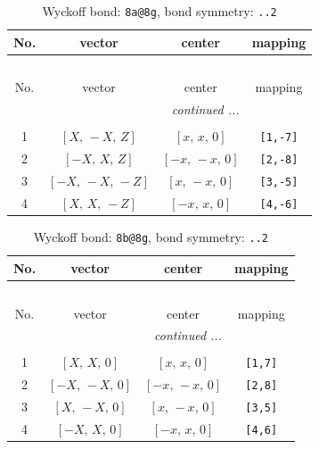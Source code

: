 \documentclass[fleqn,8pt]{jsarticle}
\begin{document}
\begin{longtable}{cccc}
\caption{Wyckoff bond: {\tt 8a@8g}, bond symmetry: {\tt ..2}}
 \\
 \hline \hline
No. & vector & center & mapping \\ \hline \endfirsthead

\multicolumn{3}{l}{\tablename\ \thetable{}} \\
 \hline \hline
No. & vector & center & mapping \\ \hline \endhead

 \hline \hline
\multicolumn{3}{r}{\footnotesize\it continued ...} \\ \endfoot

 \hline \hline
\multicolumn{3}{r}{} \\ \endlastfoot

1 & $\left[ X,\, - X,\, Z \right]$ & $\left[ x,\, x,\, 0 \right]$ & {\tt [1,-7]} \\ \hline
2 & $\left[ - X,\, X,\, Z \right]$ & $\left[ - x,\, - x,\, 0 \right]$ & {\tt [2,-8]} \\ \hline
3 & $\left[ - X,\, - X,\, - Z \right]$ & $\left[ x,\, - x,\, 0 \right]$ & {\tt [3,-5]} \\ \hline
4 & $\left[ X,\, X,\, - Z \right]$ & $\left[ - x,\, x,\, 0 \right]$ & {\tt [4,-6]} \\
\end{longtable}
\renewcommand{\arraystretch}{1.2}
\begin{longtable}{cccc}
\caption{Wyckoff bond: {\tt 8b@8g}, bond symmetry: {\tt ..2}}
 \\
 \hline \hline
No. & vector & center & mapping \\ \hline \endfirsthead

\multicolumn{3}{l}{\tablename\ \thetable{}} \\
 \hline \hline
No. & vector & center & mapping \\ \hline \endhead

 \hline \hline
\multicolumn{3}{r}{\footnotesize\it continued ...} \\ \endfoot

 \hline \hline
\multicolumn{3}{r}{} \\ \endlastfoot

1 & $\left[ X,\, X,\, 0 \right]$ & $\left[ x,\, x,\, 0 \right]$ & {\tt [1,7]} \\ \hline
2 & $\left[ - X,\, - X,\, 0 \right]$ & $\left[ - x,\, - x,\, 0 \right]$ & {\tt [2,8]} \\ \hline
3 & $\left[ X,\, - X,\, 0 \right]$ & $\left[ x,\, - x,\, 0 \right]$ & {\tt [3,5]} \\ \hline
4 & $\left[ - X,\, X,\, 0 \right]$ & $\left[ - x,\, x,\, 0 \right]$ & {\tt [4,6]} \\
\end{longtable}
\end{document}
